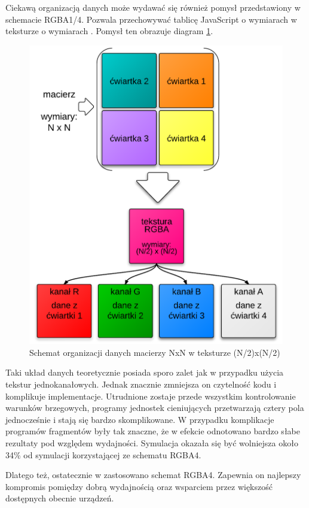 Ciekawą organizacją danych może wydawać się również pomysł przedstawiony w
schemacie RGBA1/4. Pozwala przechowywać tablicę JavaScript o wymiarach 
w teksturze o wymiarach . Pomysł ten obrazuje diagram
\ref{fig:rgba14Tex}.

\begin{figure}[!h]
\centering
\includegraphics[width=.9\textwidth]{img/rgba14Tex}
\caption{Schemat organizacji danych macierzy NxN w teksturze (N/2)x(N/2)}
\label{fig:rgba14Tex}
\end{figure}

Taki układ danych teoretycznie posiada sporo zalet jak w przypadku użycia
tekstur jednokanałowych. Jednak znacznie zmniejsza on czytelność kodu i
komplikuje implementacje. Utrudnione zostaje przede wszystkim kontrolowanie
warunków brzegowych, programy jednostek cieniujących przetwarzają cztery pola
jednocześnie i stają się bardzo skomplikowane. W przypadku 
komplikacje programów fragmentów były tak znaczne, że w efekcie odnotowano
bardzo słabe rezultaty pod względem wydajności. Symulacja okazała się być
wolniejsza około 34\% od symulacji korzystającej ze schematu RGBA4.

Dlatego też, ostatecznie w  zastosowano schemat RGBA4. Zapewnia on
najlepszy kompromis pomiędzy dobrą wydajnością oraz wsparciem przez większość
dostępnych obecnie urządzeń.

